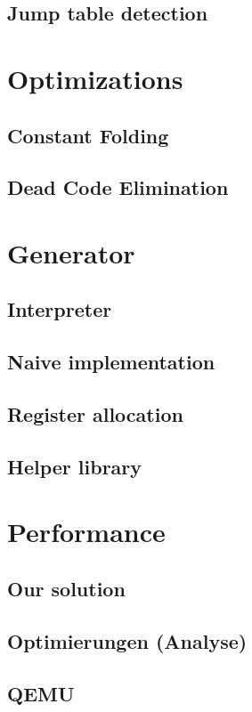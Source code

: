 \documentclass[course=eragp]{aspdoc}
\begin{document}
\subsection{Jump table detection}

\section{Optimizations}
\subsection{Constant Folding}
\subsection{Dead Code Elimination}

\clearpage

\section{Generator}
\subsection{Interpreter}
\subsection{Naive implementation}
\subsection{Register allocation}
\subsection{Helper library}

\section{Performance}
\subsection{Our solution}
\subsection{Optimierungen (Analyse)}
\subsection{QEMU}
\end{document}
